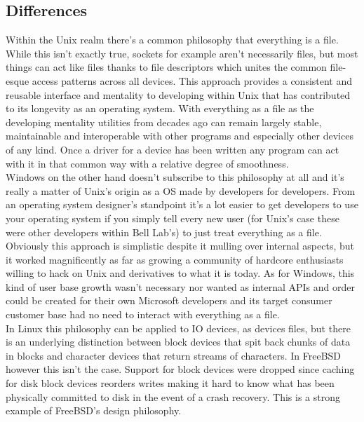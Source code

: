 \documentclass[letterpaper,10pt,draftclsnofoot,onecolumn]{IEEEtran}
\begin{document}
\subsection{Differences}
Within the Unix realm there’s a common philosophy \cite{love} that everything is a file. While this isn’t exactly true, sockets for example aren’t necessarily files, but most things can act like files thanks to file descriptors which unites the common file-esque access patterns across all devices. This approach provides a consistent and reusable interface and mentality to developing within Unix that has contributed to its longevity as an operating system. With everything as a file as the developing mentality utilities from decades ago can remain largely stable, maintainable and interoperable with other programs and especially other devices of any kind. Once a driver for a device has been written any program can act with it in that common way with a relative degree of smoothness.\\
Windows on the other hand doesn’t subscribe to this philosophy at all and it’s really a matter of Unix’s origin as a OS made by developers for developers. From an operating system designer’s standpoint it’s a lot easier to get developers to use your operating system if you simply tell every new user (for Unix’s case these were other developers within Bell Lab’s) to just treat everything as a file. Obviously this approach is simplistic despite it mulling over internal aspects, but it worked magnificently as far as growing a community of hardcore enthusiasts willing to hack on Unix and derivatives to what it is today. As for Windows, this kind of user base growth wasn’t necessary nor wanted as internal APIs and order could be created for their own Microsoft developers and its target consumer customer base had no need to interact with everything as a file.\\
In Linux this philosophy can be applied to IO devices, as devices files, but there is an underlying distinction between block devices that spit back chunks of data in blocks and character devices that return streams of characters. In FreeBSD however this isn’t the case. \cite{freebsdarch} Support for block devices were dropped since caching for disk block devices reorders writes making it hard to know what has been physically committed to disk in the event of a crash recovery. This is a strong example of FreeBSD’s design philosophy.\\
\newpage
\end{document}
